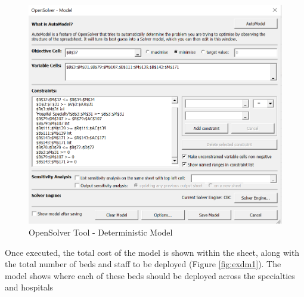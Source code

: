 \documentclass[../thesis.tex]{subfiles}
\begin{document}
\begin{figure}[h!]
    \centering
    \includegraphics[scale=0.5]{Chapters/Chapter7/Figures/DeterministicOS.png}
    \caption{OpenSolver Tool - Deterministic Model}
    \label{fig:exdmos}
\end{figure}
Once executed, the total cost of the model is shown within the sheet, along with the total number of beds and staff to be deployed (Figure \ref{fig:exdm1}). The model shows where each of these beds should be deployed across the specialties and hospitals 
\end{document}
